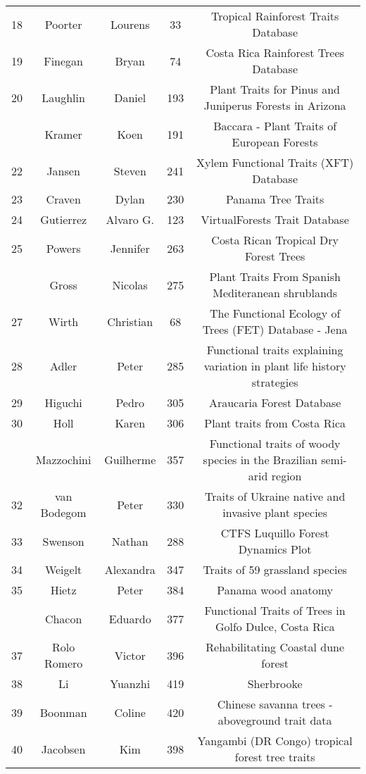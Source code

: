 \documentclass[
  12pt,
  letterpaper,
  DIV=11,
  numbers=noendperiod]{scrartcl}
\begin{document}
\begin{longtable*}[t]{ccccc}
18 & Poorter & Lourens & 33 & Tropical Rainforest Traits Database\\
19 & Finegan & Bryan & 74 & Costa Rica Rainforest Trees Database\\
20 & Laughlin & Daniel & 193 & Plant Traits for Pinus and Juniperus Forests in Arizona\\
 & Kramer & Koen & 191 & Baccara - Plant Traits of European Forests\\
22 & Jansen & Steven & 241 & Xylem Functional Traits (XFT) Database\\
23 & Craven & Dylan & 230 & Panama Tree Traits\\
24 & Gutierrez & Alvaro G. & 123 & VirtualForests Trait Database\\
25 & Powers & Jennifer & 263 & Costa Rican Tropical Dry Forest Trees\\
 & Gross & Nicolas & 275 & Plant Traits From Spanish Mediteranean shrublands\\
27 & Wirth & Christian & 68 & The Functional Ecology of Trees (FET) Database  - Jena\\
28 & Adler & Peter & 285 & Functional traits explaining variation in plant life history strategies\\
29 & Higuchi & Pedro & 305 & Araucaria Forest Database\\
30 & Holl & Karen & 306 & Plant traits from Costa Rica\\
 & Mazzochini & Guilherme & 357 & Functional traits of woody species in the Brazilian semi-arid region\\
32 & van Bodegom & Peter & 330 & Traits of Ukraine native and invasive plant species\\
33 & Swenson & Nathan & 288 & CTFS Luquillo Forest Dynamics Plot\\
34 & Weigelt & Alexandra & 347 & Traits of 59 grassland species\\
35 & Hietz & Peter & 384 & Panama wood anatomy\\
 & Chacon & Eduardo & 377 & Functional Traits of Trees in Golfo Dulce, Costa Rica\\
37 & Rolo Romero & Victor & 396 & Rehabilitating Coastal dune forest\\
38 & Li & Yuanzhi & 419 & Sherbrooke\\
39 & Boonman & Coline & 420 & Chinese savanna trees - aboveground trait data\\
40 & Jacobsen & Kim & 398 & Yangambi (DR Congo) tropical forest tree traits\\

\end{longtable*}
\end{document}
